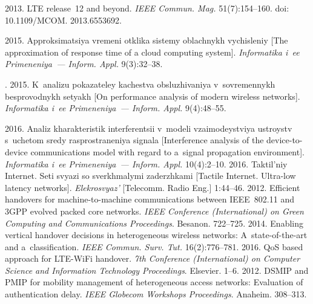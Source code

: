   \begin{multicols}{2}

\renewcommand{\bibname}{\protect\rmfamily References}

{\small\frenchspacing
 {%
 \begin{thebibliography}{99}
 2013. LTE 
release~12 and beyond. \textit{IEEE Commun. Mag.} 51(7):154--160. 
doi: 10.1109/MCOM. 2013.6553692. 


 2015. Approksimatsiya vremeni otklika sistemy oblachnykh 
vychisleniy [The approximation of response time of a cloud computing system]. 
\textit{Informatika i~ee Primeneniya~--- Inform. Appl.} 9(3):32--38.

. 2015. 
K~analizu pokazateley kachestva obsluzhivaniya v~sovremennykh besprovodnykh 
setyakh [On performance analysis of modern wireless networks]. \textit{Informatika 
i~ee Primeneniya~--- Inform. Appl.} 9(4):48--55.

 2016. Analiz kharakteristik interferentsii v~modeli 
vzaimodeystviya ustroystv s~uchetom sredy rasprostraneniya signala [Interference 
analysis of the device-to-device communications model with regard to a~signal 
propagation environment]. \textit{Informatika i~ee Primeneniya~--- Inform. Appl.} 
10(4):2--10.
 2016. 
Taktil'niy Internet. Seti svyazi so sverkhmalymi zaderzhkami [Tactile Internet. 
Ultra-low latency networks]. \textit{Elekrosvyaz'} 
[Telecomm. Radio Eng.] 1:44--46.
 2012. 
Efficient handovers for machine-to-machine communications between IEEE~802.11 
and 3GPP evolved packed core networks. \textit{IEEE  Conference (International) 
on Green Computing and Communications Proceedings}. \mbox{Besan{\!}on.}  
722--725.
 2014. Enabling vertical 
handover decisions in heterogeneous wireless networks: A~state-of-the-art and 
a~classification. \textit{IEEE Commun. Surv. Tut.} 16(2):776--781.
 2016. QoS based approach for LTE-WiFi 
handover. \textit{7th Conference (International) on Computer Science and 
Information Technology Proceedings}. Elsevier. 1--6.
 2012. DSMIP and PMIP for 
mobility management of heterogeneous access networks: Evaluation of 
authentication delay. \textit{IEEE Globecom Workshops Proceedings}. Anaheim. 
308--313.




\end{thebibliography}}}
\end{multicols}
